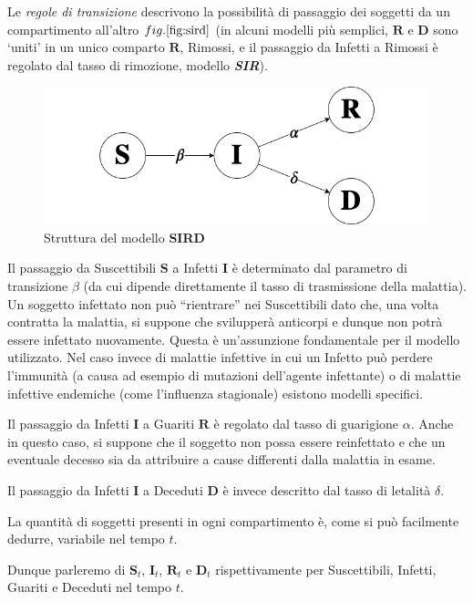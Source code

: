 \documentclass[11pt]{article}
\begin{document}
Le \emph{regole di transizione} descrivono la possibilità di passaggio
dei soggetti da un compartimento all'altro \(fig. \ref{fig:sird}\) (in alcuni
modelli più semplici, \(\mathbf{R}\) e \(\mathbf{D}\) sono `uniti' in un
unico comparto \(\mathbf{R}\), Rimossi, e il passaggio da Infetti a
Rimossi è regolato dal tasso di rimozione, modello \textbf{\emph{SIR}}).

    \begin{figure}
\centering
\includegraphics{images/sird.png}
\caption{Struttura del modello \textbf{SIRD}}
\label{fig:sird}
\end{figure}

    Il passaggio da Suscettibili \(\mathbf{S}\) a Infetti \(\mathbf{I}\) è
determinato dal parametro di transizione \(\beta\) (da cui dipende
direttamente il tasso di trasmissione della malattia). Un soggetto
infettato non può ``rientrare'' nei Suscettibili dato che, una volta
contratta la malattia, si suppone che svilupperà anticorpi e dunque non
potrà essere infettato nuovamente. Questa è un'assunzione fondamentale 
per il modello utilizzato. Nel caso invece di malattie infettive in cui un 
Infetto può perdere l'immunità (a causa ad esempio di mutazioni dell'agente infettante) 
o di malattie infettive endemiche (come l'influenza stagionale) esistono modelli specifici.

Il passaggio da Infetti \(\mathbf{I}\) a Guariti \(\mathbf{R}\) è
regolato dal tasso di guarigione \(\alpha\). Anche in questo caso, si
suppone che il soggetto non possa essere reinfettato e che un eventuale
decesso sia da attribuire a cause differenti dalla malattia in esame.

Il passaggio da Infetti \(\mathbf{I}\) a Deceduti \(\mathbf{D}\) è
invece descritto dal tasso di letalità \(\delta\).

    La quantità di soggetti presenti in ogni compartimento è, come si può
facilmente dedurre, variabile nel tempo \(t\).

Dunque parleremo di \(\mathbf{S}_t\), \(\mathbf{I}_t\), \(\mathbf{R}_t\)
e \(\mathbf{D}_t\) rispettivamente per Suscettibili, Infetti, Guariti e
Deceduti nel tempo \(t\).
\end{document}
